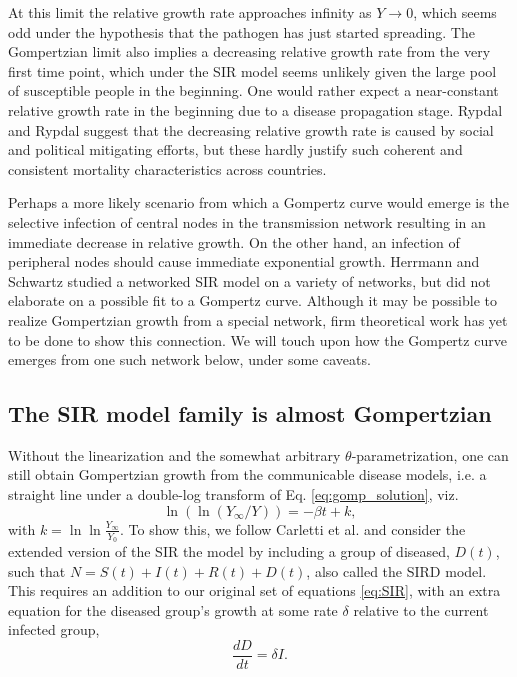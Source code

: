 \documentclass[review]{elsarticle}
\begin{document}
 At this limit the relative growth rate approaches infinity as $Y \rightarrow 0$, which seems odd under the hypothesis that the pathogen has just started spreading. 
 The Gompertzian limit also implies a decreasing relative growth rate from the very first time point, which under the SIR model seems unlikely given the large pool of susceptible people in the beginning. 
 One would rather expect a near-constant relative growth rate in the beginning due to a disease propagation stage. 
 Rypdal and Rypdal \cite{Rypdal2020} suggest that the decreasing relative growth rate is caused by social and political mitigating efforts, but these hardly justify such coherent and consistent mortality characteristics across countries. 
 
 Perhaps a more likely scenario from which a Gompertz curve would emerge is the selective infection of central nodes in the transmission network resulting in an immediate decrease in relative growth. 
 On the other hand, an infection of peripheral nodes should cause immediate exponential growth. 
 Herrmann and Schwartz \cite{herrmann2020covid} studied a networked SIR model on a variety of networks, but did not elaborate on a possible fit to a Gompertz curve. 
 Although it may be possible to realize Gompertzian growth from a special network, firm theoretical work has yet to be done to show this connection. 
 We will touch upon how the Gompertz curve emerges from one such network below, under some caveats.

\subsection{The SIR model family is almost Gompertzian}
Without the linearization and the somewhat arbitrary $\theta$-parametrization, one can still obtain Gompertzian growth from the communicable disease models, i.e. a straight line under a double-log transform of Eq. \ref{eq:gomp_solution}, viz.
\begin{equation}
\label{eq:GOMP_D}
\ln{(\ln{(Y_{\infty}/Y)})} = -\beta t + k,
\end{equation}
with $k=\ln{\ln{\frac{Y_{\infty}}{Y_{0}}}}$. To show this, we follow Carletti et al. \cite{carletti2020covid} and consider the extended version of the SIR the model by including a group of diseased, $D(t)$, such that $N = S(t) + I(t) + R(t) + D(t)$, also called the SIRD model. This requires an addition to our original set of equations \ref{eq:SIR}, with an extra equation for the diseased group's growth at some rate $\delta$ relative to the current infected group,
\begin{equation}
\frac{dD}{dt} = \delta I.
\end{equation}
\end{document}
